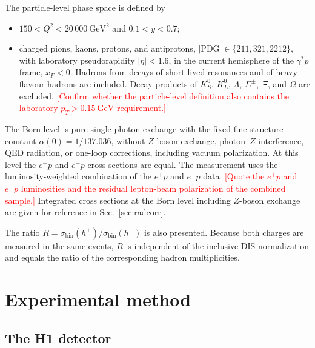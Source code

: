 \documentclass[11pt,a4paper]{article}
\newcommand{\Qsq}{Q^{2}}
\newcommand{\hplus}{h^{+}}
\newcommand{\hminus}{h^{-}}
\newcommand{\GeV}{\mathrm{GeV}}
\newcommand{\GeVsq}{\mathrm{GeV}^{2}}
\newcommand{\draft}[1]{\textcolor{red}{#1}}
\begin{document}
The particle-level phase space is defined by
\begin{itemize}
  \item $150<\Qsq<20\,000~\GeVsq$ and $0.1<y<0.7$;
  \item charged pions, kaons, protons, and antiprotons, $|\mathrm{PDG}|\in\{211,321,2212\}$, with laboratory pseudorapidity $|\eta|<1.6$, in the current hemisphere of the $\gamma^{*}p$ frame, $x_{F}<0$. Hadrons from decays of short-lived resonances and of heavy-flavour hadrons are included. Decay products of $K^{0}_{S}$, $K^{0}_{L}$, $\Lambda$, $\Sigma^{\pm}$, $\Xi$, and $\Omega$ are excluded. \draft{[Confirm whether the particle-level definition also contains the laboratory $p_{T}>0.15~\GeV$ requirement.]}
\end{itemize}
The Born level is pure single-photon exchange with the fixed fine-structure constant $\alpha(0)=1/137.036$, without $Z$-boson exchange, photon--$Z$ interference, QED radiation, or one-loop corrections, including vacuum polarization. At this level the $e^{+}p$ and $e^{-}p$ cross sections are equal. The measurement uses the luminosity-weighted combination of the $e^{+}p$ and $e^{-}p$ data. \draft{[Quote the $e^{+}p$ and $e^{-}p$ luminosities and the residual lepton-beam polarization of the combined sample.]} Integrated cross sections at the Born level including $Z$-boson exchange are given for reference in Sec.~\ref{sec:radcorr}.

The ratio $R=\sigma_{\mathrm{bin}}(\hplus)/\sigma_{\mathrm{bin}}(\hminus)$ is also presented. Because both charges are measured in the same events, $R$ is independent of the inclusive DIS normalization and equals the ratio of the corresponding hadron multiplicities.

\section{Experimental method}
\label{sec:experiment}

\subsection{The H1 detector}
\end{document}
